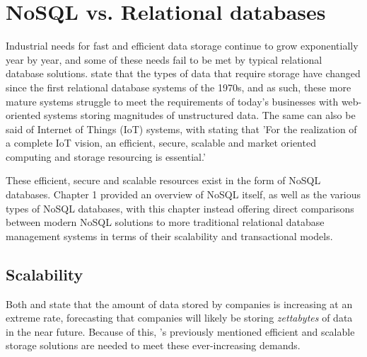 

\chapter{NoSQL vs. Relational databases} 



Industrial needs for fast and efficient data storage continue to grow exponentially year by year, and some of these needs fail to be met 
by typical relational database solutions. \textcite{corbelliniPersistingBigdataNoSQL2017} state that the types of data that require storage 
have changed since the first relational database systems of the 1970s, and as such, these more mature systems struggle to meet the requirements of
today's businesses with web-oriented systems storing magnitudes of unstructured data. The same can also be said of Internet of Things 
(IoT) systems, with  \textcite{gubbiInternetThingsIoT2013} stating that 'For the realization of a complete IoT vision, an efficient, secure,
scalable and market oriented computing and storage resourcing is essential.'

\para These efficient, secure and scalable resources exist in the form of NoSQL databases. Chapter 1 provided an overview of NoSQL itself, as well 
as the various types of NoSQL databases, with this chapter instead offering direct comparisons between modern NoSQL solutions to more traditional
relational database management systems in terms of their scalability and transactional models. 


\section{Scalability}
Both \textcite{ganiSurveyIndexingTechniques2016} and \textcite{katalBigDataIssues2013} state that the amount of data stored by companies 
is increasing at an extreme rate, forecasting that companies will likely be storing \textit{zettabytes} of data in the near future.
Because of this, \textcite{gubbiInternetThingsIoT2013}'s previously mentioned efficient and scalable storage solutions are needed to meet 
these ever-increasing demands.

